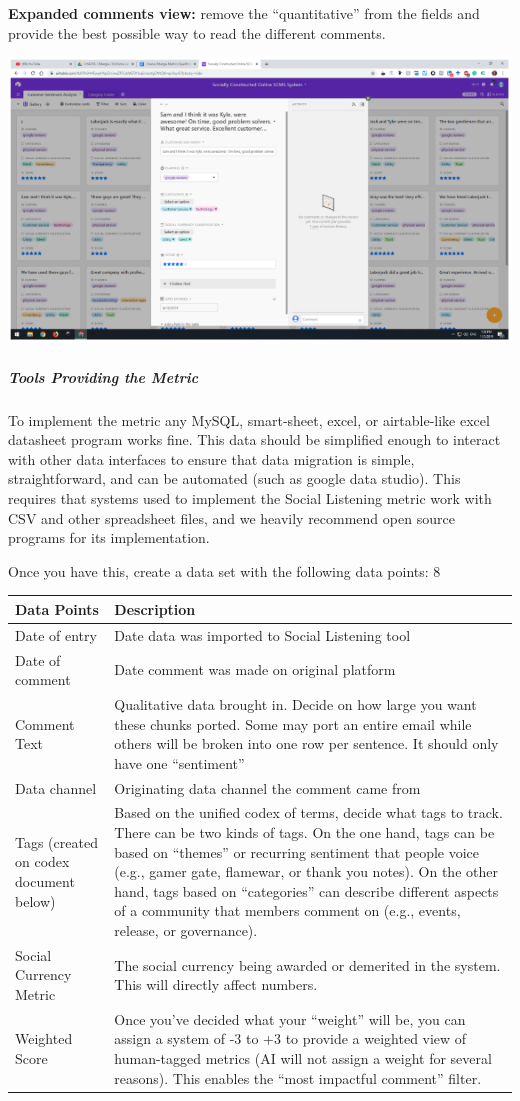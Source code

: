 \textbf{Expanded comments view:} remove the ``quantitative'' from the
fields and provide the best possible way to read the different comments.

\includegraphics{images/social-listening_expanded-comment.png}

\hypertarget{tools-providing-the-metric}{%
\subparagraph{Tools Providing the
Metric}\label{tools-providing-the-metric}}

To implement the metric any MySQL, smart-sheet, excel, or airtable-like
excel datasheet program works fine. This data should be simplified
enough to interact with other data interfaces to ensure that data
migration is simple, straightforward, and can be automated (such as
google data studio). This requires that systems used to implement the
Social Listening metric work with CSV and other spreadsheet files, and
we heavily recommend open source programs for its implementation.

Once you have this, create a data set with the following data points: 8

\begin{longtable}[]{@{}ll@{}}
\toprule
Data Points & Description\tabularnewline
\midrule
\endhead
Date of entry & Date data was imported to Social Listening
tool\tabularnewline
Date of comment & Date comment was made on original
platform\tabularnewline
Comment Text & Qualitative data brought in. Decide on how large you want
these chunks ported. Some may port an entire email while others will be
broken into one row per sentence. It should only have one
``sentiment''\tabularnewline
Data channel & Originating data channel the comment came
from\tabularnewline
Tags (created on codex document below) & Based on the unified codex of
terms, decide what tags to track. There can be two kinds of tags. On the
one hand, tags can be based on ``themes'' or recurring sentiment that
people voice (e.g., gamer gate, flamewar, or thank you notes). On the
other hand, tags based on ``categories'' can describe different aspects
of a community that members comment on (e.g., events, release, or
governance).\tabularnewline
Social Currency Metric & The social currency being awarded or demerited
in the system. This will directly affect numbers.\tabularnewline
Weighted Score & Once you've decided what your ``weight'' will be, you
can assign a system of -3 to +3 to provide a weighted view of
human-tagged metrics (AI will not assign a weight for several reasons).
This enables the ``most impactful comment'' filter.\tabularnewline
\bottomrule
\end{longtable}


